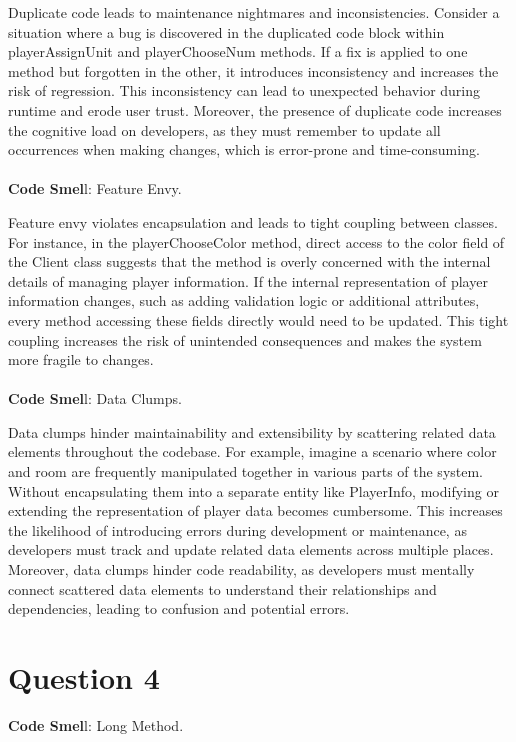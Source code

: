 \documentclass[12pt]{article}
\numberwithin{table}{section}
\begin{document}
	Duplicate code leads to maintenance nightmares and inconsistencies. Consider a situation where a bug is discovered in the duplicated code block within playerAssignUnit and playerChooseNum methods. If a fix is applied to one method but forgotten in the other, it introduces inconsistency and increases the risk of regression. This inconsistency can lead to unexpected behavior during runtime and erode user trust. Moreover, the presence of duplicate code increases the cognitive load on developers, as they must remember to update all occurrences when making changes, which is error-prone and time-consuming.\\
	\\
	\textbf{Code Smel}l: Feature Envy.
	
	Feature envy violates encapsulation and leads to tight coupling between classes. For instance, in the playerChooseColor method, direct access to the color field of the Client class suggests that the method is overly concerned with the internal details of managing player information. If the internal representation of player information changes, such as adding validation logic or additional attributes, every method accessing these fields directly would need to be updated. This tight coupling increases the risk of unintended consequences and makes the system more fragile to changes.\\
	\\
	\textbf{Code Smel}l: Data Clumps.
	
	Data clumps hinder maintainability and extensibility by scattering related data elements throughout the codebase. For example, imagine a scenario where color and room are frequently manipulated together in various parts of the system. Without encapsulating them into a separate entity like PlayerInfo, modifying or extending the representation of player data becomes cumbersome. This increases the likelihood of introducing errors during development or maintenance, as developers must track and update related data elements across multiple places. Moreover, data clumps hinder code readability, as developers must mentally connect scattered data elements to understand their relationships and dependencies, leading to confusion and potential errors.
	
	\section*{Question 4}
	\textbf{Code Smel}l: Long Method.
	
\end{document}
